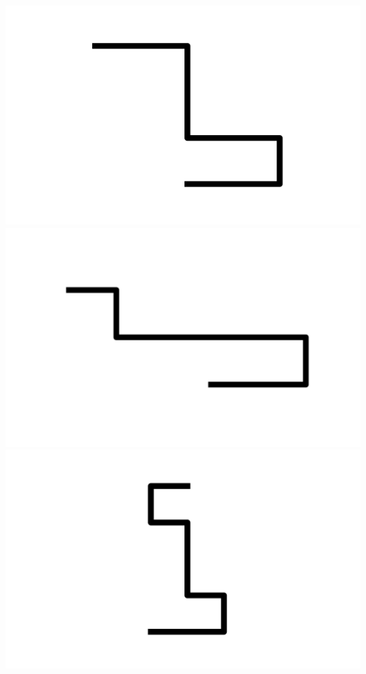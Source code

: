\documentclass[]{report}
\begin{document}
\includegraphics[scale=.1]{pictures/21/state_cluster_shapes_379.pdf} 
\includegraphics[scale=.1]{pictures/21/state_cluster_shapes_380.pdf} 
\includegraphics[scale=.1]{pictures/21/state_cluster_shapes_381.pdf} 
\end{document}
